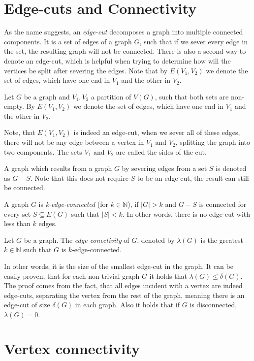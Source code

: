 \documentclass[12pt, twoside]{book}
\begin{document}
\section{Edge-cuts and Connectivity}\label{sec:edge-cuts}

As the name suggests, an \textit{edge-cut} decomposes a graph into multiple connected components. It is a set of edges of a graph $G$, such that if we sever every edge in the set, the resulting graph will not be connected. There is also a second way to denote an edge-cut, which is helpful when trying to determine how will the vertices be split after severing the edges. Note that by $E(V_1,V_2)$ we denote the set of edges, which have one end in $V_1$ and the other in $V_2$.

Let $G$ be a graph and ${V_1,V_2}$ a partition of $V(G)$, such that both sets are non-empty. By $E(V_1,V_2)$ we denote the set of edges, which have one end in $V_1$ and the other in $V_2$.

Note, that $E(V_1,V_2)$ is indeed an edge-cut, when we sever all of these edges, there will not be any edge between a vertex in $V_1$ and $V_2$, splitting the graph into two components. The sets $V_1$ and $V_2$ are called the sides of the cut.

A graph which results from a graph $G$ by severing edges from a set $S$ is denoted as $G-S$. Note that this does not require $S$ to be an edge-cut, the result can still be connected.

A graph $G$ is \textit{k-edge-connected} (for $k\in\mathbb{N}$), if $|G|>k$ and $G-S$ is connected for every set $S\subseteq E(G)$ such that $|S|<k$. In other words, there is no edge-cut with less than $k$ edges.

\begin{definition}
	Let $G$ be a graph. The \textit{edge conectivity} of $G$, denoted by $\lambda(G)$ is the greatest $k\in\mathbb{N}$ such that $G$ is $k$-edge-connected.
\end{definition}

In other words, it is the size of the smallest edge-cut in the graph. It can be easily proven, that for each non-trivial graph $G$ it holds that $\lambda(G)\leq\delta(G)$. The proof comes from the fact, that all edges incident with a vertex are indeed edge-cuts, separating the vertex from the rest of the graph, meaning there is an edge-cut of size $\delta(G)$ in each graph. Also it holds that if $G$ is disconnected, $\lambda(G)=0$.

\section{Vertex connectivity}
\end{document}
